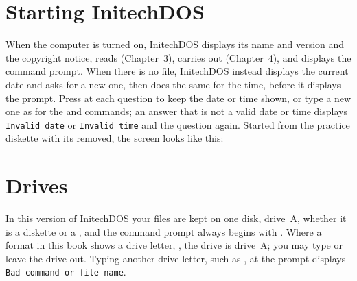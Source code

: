 \section{Starting InitechDOS}
When the computer is turned on, InitechDOS displays its name and version
and the copyright notice, reads  (Chapter~3), carries out
 (Chapter~4), and displays the command prompt.  When
there is no  file, InitechDOS instead displays the
current date and asks for a new one, then does the same for the time,
before it displays the prompt.  Press  at each question to keep
the date or time shown, or type a new one as for the  and
 commands; an answer that is not a valid date or time displays
\texttt{Invalid date} or \texttt{Invalid time} and the question again.
Started from the practice diskette with its  removed,
the screen looks like this:

\section{Drives}
In this version of InitechDOS your files are kept on one disk, drive~A,
whether it is a diskette or a , and the command prompt always begins with .  Where a format in this
book shows a drive letter, \kw{:}, the drive is drive~A; you may
type  or leave the drive out.  Typing another drive letter, such
as , at the prompt displays \texttt{Bad command or file name}.
